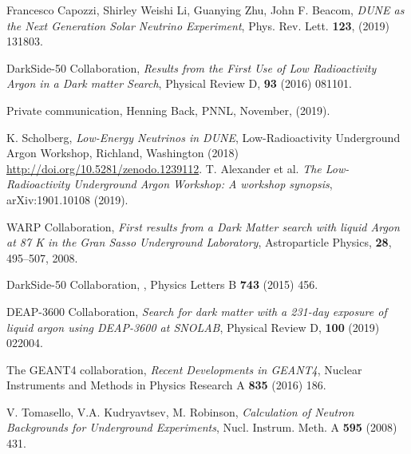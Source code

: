 \documentclass[a4paper,11pt]{article}
\begin{document}
\begin{thebibliography}{99}
Francesco Capozzi, Shirley Weishi Li, Guanying Zhu, John F. Beacom, \emph{DUNE as the Next Generation Solar Neutrino Experiment}, Phys. Rev. Lett. {\bf 123}, (2019) 131803.

DarkSide-50 Collaboration, \emph {Results from the First Use of Low Radioactivity Argon in a Dark matter Search}, Physical Review D, {\bf 93} (2016) 081101.

Private communication, Henning Back, PNNL, November, (2019).

K. Scholberg, \emph{Low-Energy Neutrinos in DUNE}, Low-Radioactivity Underground Argon Workshop, Richland, Washington (2018) \url{http://doi.org/10.5281/zenodo.1239112}. T. Alexander et al. \emph{The Low-Radioactivity Underground Argon Workshop: A workshop synopsis}, arXiv:1901.10108 (2019).

	
WARP Collaboration, \emph{First results from a Dark Matter search with liquid Argon at 87 K in the Gran Sasso Underground Laboratory}, Astroparticle Physics, {\bf 28}, 495--507, 2008.


DarkSide-50 Collaboration,
,
\newblock Physics Letters B {\bf 743} (2015) 456.

DEAP-3600 Collaboration, 
{\em Search for dark matter with a 231-day exposure of liquid argon using DEAP-3600 at SNOLAB}, Physical
Review D, {\bf 100} (2019) 022004.

The GEANT4 collaboration, \emph{Recent Developments in GEANT4}, Nuclear Instruments and Methods in Physics Research A {\bf 835} (2016) 186.

V. Tomasello, V.A. Kudryavtsev, M. Robinson, 
\emph {Calculation of Neutron Backgrounds for Underground Experiments}, 
Nucl. Instrum. Meth. A {\bf 595} (2008) 431.



\end{thebibliography}
\end{document}
